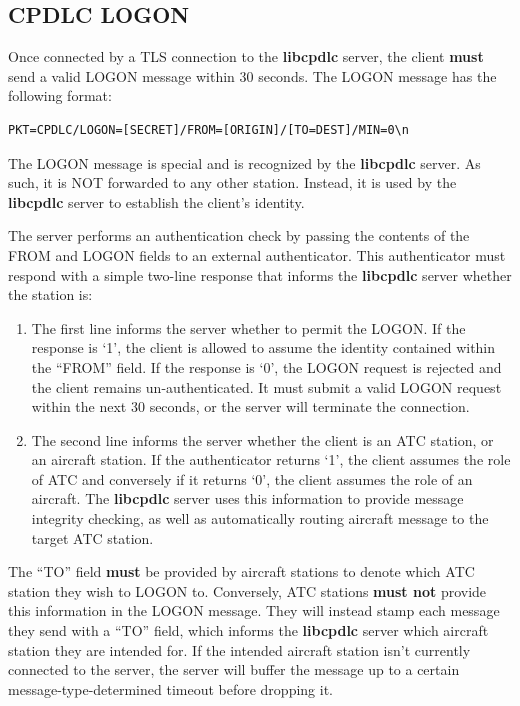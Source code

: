 \documentclass[a4paper,12pt]{article}
\newcommand{\libcpdlc}{\textbf{libcpdlc}\xspace}
\begin{document}
\subsection{CPDLC LOGON}

Once connected by a TLS connection to the \libcpdlc server, the client
\textbf{must} send a valid LOGON message within 30 seconds. The LOGON
message has the following format:

\begin{verbatim}
PKT=CPDLC/LOGON=[SECRET]/FROM=[ORIGIN]/[TO=DEST]/MIN=0\n
\end{verbatim}

\noindent The LOGON message is special and is recognized by the \libcpdlc
server. As such, it is NOT forwarded to any other station. Instead, it is
used by the \libcpdlc server to establish the client's identity.

The server performs an authentication check by passing the contents of
the FROM and LOGON fields to an external authenticator. This
authenticator must respond with a simple two-line response that
informs the \libcpdlc server whether the station is:

\begin{enumerate}

\item The first line informs the server whether to permit the LOGON. If
the response is `1', the client is allowed to assume the identity
contained within the ``FROM'' field. If the response is `0', the LOGON
request is rejected and the client remains un-authenticated. It must
submit a valid LOGON request within the next 30 seconds, or the server
will terminate the connection.

\item The second line informs the server whether the client is an ATC
station, or an aircraft station. If the authenticator returns `1', the
client assumes the role of ATC and conversely if it returns `0', the
client assumes the role of an aircraft. The \libcpdlc server uses this
information to provide message integrity checking, as well as
automatically routing aircraft message to the target ATC station.

\end{enumerate}

\noindent The ``TO'' field \textbf{must} be provided by aircraft stations
to denote which ATC station they wish to LOGON to. Conversely, ATC
stations \textbf{must not} provide this information in the LOGON message.
They will instead stamp each message they send with a ``TO'' field, which
informs the \libcpdlc server which aircraft station they are intended
for. If the intended aircraft station isn't currently connected to the
server, the server will buffer the message up to a certain
message-type-determined timeout before dropping it.
\end{document}
